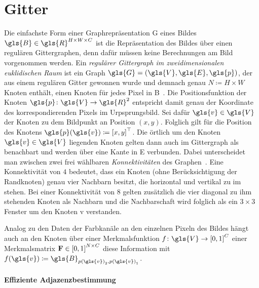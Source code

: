 \section{Gitter}
\label{gitter}

Die einfachste Form einer Graphrepräsentation \gls{G} eines Bildes $\gls{B} \in \gls{R}^{H \times W \times C}$ ist die Repräsentation des Bildes über einen regulären Gittergraphen, denn dafür müssen keine Berechnungen am Bild vorgenommen werden.
Ein \emph{regulärer Gittergraph im zweidimensionalen euklidischen Raum} ist ein Graph $\gls{G} = \left(\gls{V}, \gls{E}, \gls{p}\right)$, der aus einem regulären Gitter gewonnen wurde und demnach genau $N \coloneqq H \times W$ Knoten enthält, \dhe{} einen Knoten für jedes Pixel in \gls{B}~\cite{Defferrard}.
Die Positionsfunktion der Knoten $\gls{p} \colon \gls{V} \to \gls{R}^2$ entspricht damit genau der Koordinate des korrespondierenden Pixels im Urpsprungsbild.
Sei dafür $\gls{v} \in \gls{V}$ der Knoten zu dem Bildpunkt an Position $\left(x,y\right)$.
Folglich gilt für die Position des Knotens $\gls{p}\left(\gls{v}\right) \coloneqq {\left[x,y\right]}^{\top}$.
Die örtlich um den Knoten $\gls{v} \in \gls{V}$ liegenden Knoten gelten dann auch im Gittergraph als benachbart und werden über eine Kante in \gls{E} verbunden.
Dabei unterscheidet man zwischen zwei frei wählbaren \emph{Konnektivitäten} des Graphen~\cite{Defferrard}.
Eine Konnektivität von $4$ bedeutet, dass ein Knoten (ohne Berücksichtigung der Randknoten) genau vier Nachbarn besitzt, die horizontal und vertikal zu im stehen.
Bei einer Konnektivität von $8$ gelten zusätzlich die vier diagonal zu ihm stehenden Knoten als Nachbarn und die Nachbarschaft wird folglich als ein $3 \times 3$ Fenster um den Knoten \gls{v} verstanden.

Analog zu den Daten der Farbkanäle an den einzelnen Pixeln des Bildes hängt auch an den Knoten über einer Merkmalsfunktion $f \colon \gls{V} \to {\left[0,1\right]}^C$ \bzw{} einer Merkmalsmatrix $\ma{F} \in {\left[0,1\right]}^{N \times C}$ diese Information mit $f\left(\gls{v}\right) \coloneqq \gls{B}_{{p\left(\gls{v}\right)}_2,{p\left(\gls{v}\right)}_1}$.

\paragraph{Effiziente Adjazenzbestimmung}
\label{adjazenzbestimmung_gitter}

